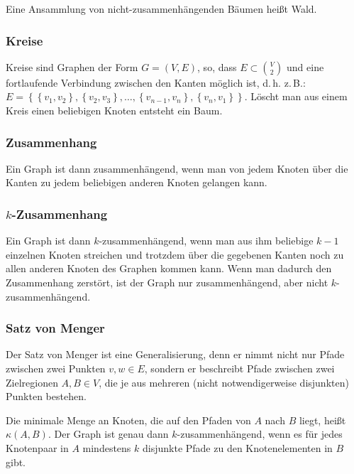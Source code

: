 \documentclass{scrartcl}
\begin{document}
Eine Ansammlung von nicht-zusammenhängenden Bäumen heißt Wald.

\subsubsection{Kreise}

Kreise sind Graphen der Form $G = (V, E)$, so, dass $E \subset \binom{V}{2}$ und eine fortlaufende Verbindung
zwischen den Kanten möglich ist, d.\,h. z.\,B.: 
$E = \left\{\left\{v_1, v_2\right\}, \left\{v_2, v_3\right\}, \dots, \left\{v_{n - 1}, v_n\right\}, \left\{v_n, v_1\right\}\right\}$. Löscht
man aus einem Kreis einen beliebigen Knoten entsteht ein Baum.

\subsubsection{Zusammenhang}

Ein Graph ist dann zusammenhängend, wenn man von jedem Knoten über die Kanten zu jedem beliebigen anderen Knoten gelangen kann.

\subsubsection{$k$-Zusammenhang}

Ein Graph ist dann $k$-zusammenhängend, wenn man aus ihm beliebige $k - 1$ einzelnen Knoten streichen 
und trotzdem über die gegebenen Kanten noch zu allen anderen Knoten des Graphen kommen kann. Wenn man 
dadurch den Zusammenhang zerstört, ist der Graph nur zusammenhängend, aber nicht
$k$-zusammenhängend.

\subsubsection{Satz von Menger}

Der Satz von Menger ist eine Generalisierung, denn er nimmt nicht nur Pfade zwischen zwei Punkten $v, w \in E$,
sondern er beschreibt Pfade zwischen zwei Zielregionen $A, B \in V$, die je aus mehreren (nicht notwendigerweise
disjunkten) Punkten bestehen. 


Die minimale Menge an Knoten, die auf den Pfaden von $A$ nach $B$ liegt, heißt $\kappa(A, B)$. Der Graph ist genau dann $k$-zusammenhängend,
wenn es für jedes Knotenpaar in $A$ mindestens $k$ disjunkte Pfade zu den Knotenelementen in $B$ gibt.
\end{document}
